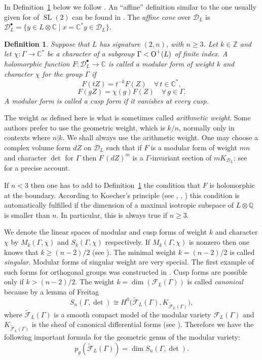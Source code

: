 \documentclass[a4paper,11pt]{article}
\newtheorem{definition}[lemma]{Definition}
\newcommand{\CC}{\mathbb C}
\newcommand{\QQ}{\mathbb Q}
\newcommand{\ZZ}{\mathbb Z}
\renewcommand{\cD}{\mathcal D}
\newcommand{\cF}{\mathcal F}
\newcommand{\tensor}{\otimes}
\renewcommand{\Tilde}{\widetilde}
\newcommand{\SL}{\mathop{\mathrm {SL}}\nolimits}
\newcommand{\Orth}{\mathop{\null\mathrm {O}}\nolimits}
\begin{document}
In Definition~\ref{def:modfm} below we follow \cite{B1}. An ``affine''
definition similar to the one usually given for of $\SL(2)$ can be
found in \cite{G2}. The \emph{affine cone} over $\cD_L$ is
$\cD_L^\bullet=\{ y\in L\tensor \CC\mid x=\CC^*y\in \cD_L\}$.
\begin{definition}\label{def:modfm}
  Suppose that $L$ has signature $(2,n)$, with $n\ge 3$. Let $k\in
  \ZZ$ and let $\chi \colon \Gamma\to \CC^*$ be a character of a
  subgroup $\Gamma< \Orth^+(L)$ of finite index.  A holomorphic
  function $F\colon\cD_L^\bullet\to \CC$ is called a \emph{modular form} of
  \emph{weight} $k$ and character $\chi$ for the group $\Gamma$ if
\begin{equation*}
F(tZ)=t^{-k}F(Z)\quad \forall\,t\in \CC^*,
\end{equation*}
\begin{equation*}
  F(gZ)=\chi(g)F(Z)\quad  \forall\,g\in \Gamma.
\end{equation*}
A modular form is called a \emph{cusp form} if it vanishes at every
cusp.
\end{definition}
The weight as defined here is what is sometimes called
\emph{arithmetic weight}. Some authors prefer to use the geometric
weight, which is $k/n$, normally only in contexts where $n|k$. We
shall always use the arithmetic weight. One may choose a complex
volume form $dZ$ on $\cD_L$ such that if $F$ is a modular form of
weight $mn$ and character $\det$ for $\Gamma$ then
$F\,(dZ)^m$ is a $\Gamma$-invariant section of $mK_{\cD_L}$:
see~\cite{Bau} for a precise account.

If $n<3$ then one has to add to Definition~\ref{def:modfm} the
condition that $F$ is holomorphic at the boundary.  According to
Koecher's principle (see \cite{Ba}, \cite{F1}, \cite{P-S}) this
condition is automatically fulfilled if the dimension of a maximal
isotropic subspace of $L\otimes \QQ$ is smaller than $n$. In
particular, this is always true if $n\ge 3$.

We denote the linear spaces of modular and cusp forms of weight $k$
and character $\chi$ by $M_k(\Gamma,\chi)$ and $S_k(\Gamma,\chi)$
respectively.  If $M_k(\Gamma,\chi)$ is nonzero then one knows that
$k\ge (n-2)/2$ (see \cite{G2}).  The minimal weight $k=(n-2)/2$ is
called \emph{singular}. Modular forms of singular weight are very
special. The first example of such forms for orthogonal groups was
constructed in \cite{G1}.  Cusp forms are possible only if
$k>(n-2)/2$.  The weight $k=\dim(\cF_L(\Gamma))$ is called
\emph{canonical} because by a lemma of Freitag
\begin{equation*}
S_n(\Gamma, \det)\cong H^0\bigl(\Tilde{\cF}_L(\Gamma),
K_{\Tilde{\cF}_L(\Gamma)}\bigr),
\end{equation*}
where $\Tilde{\cF}_L(\Gamma)$ is a smooth compact model of the modular
variety $\cF_L(\Gamma)$ and $K_{\Tilde{\cF}_L(\Gamma)}$ is the sheaf
of canonical differential forms (see \cite[Hilfssatz 2.1,
  Kap. 3]{F1}). Therefore we have the following important formula for
the geometric genus of the modular variety:
\begin{equation}\label{geom-genus}
p_g(\Tilde{\cF}_L(\Gamma))=\dim S_n(\Gamma, \det).
\end{equation}
\end{document}
